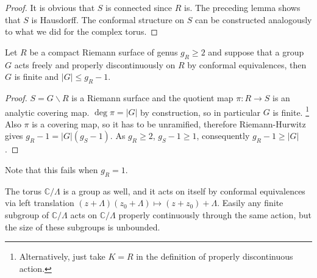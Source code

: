 \begin{proof}
    It is obvious that $S$ is connected since $R$ is.
    The preceding lemma shows that $S$ is Hausdorff.
    The conformal structure on $S$ can be constructed analogously to what we did for the complex torus.
\end{proof}
\begin{theorem}
    Let $R$ be a compact Riemann surface of genus $g_R\ge 2$ and suppose that a group $G$ acts freely and properly discontinuously on $R$ by conformal equivalences, then $G$ is finite and $|G|\le g_R-1$.
\end{theorem}
\begin{proof}
    $S=G\backslash R$ is a Riemann surface and the quotient map $\pi:R\to S$ is an analytic covering map.
    $\deg\pi=|G|$ by construction, so in particular $G$ is finite.
    \footnote{Alternatively, just take $K=R$ in the definition of properly discontinuous action.}
    Also $\pi$ is a covering map, so it has to be unramified, therefore Riemann-Hurwitz gives $g_R-1=|G|(g_S-1)$.
    As $g_R\ge 2$, $g_S-1\ge 1$, consequently $g_R-1\ge |G|$.
\end{proof}
Note that this fails when $g_R=1$.
\begin{example}
    The torus $\mathbb C/\Lambda$ is a group as well, and it acts on itself by conformal equivalences via left translation $(z+\Lambda)(z_0+\Lambda)\mapsto (z+z_0)+\Lambda$.
    Easily any finite subgroup of $\mathbb C/\Lambda$ acts on $\mathbb C/\Lambda$ properly continuously through the same action, but the size of these subgroups is unbounded.
\end{example}